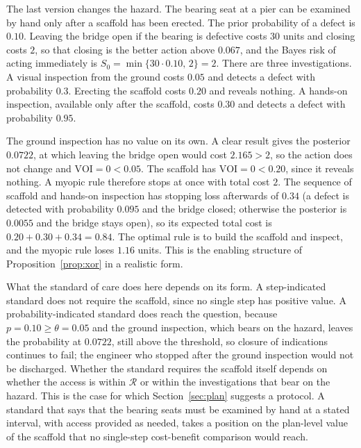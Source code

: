 \documentclass[11pt]{article}
\theoremstyle{plain}
\theoremstyle{definition}
\begin{document}
The last version changes the hazard. The bearing seat at a pier can be examined by hand only after a scaffold has been erected. The prior probability of a defect is $0.10$. Leaving the bridge open if the bearing is defective costs $30$ units and closing costs $2$, so that closing is the better action above $0.067$, and the Bayes risk of acting immediately is $S_0=\min\{30\cdot0.10,\,2\}=2$. There are three investigations. A visual inspection from the ground costs $0.05$ and detects a defect with probability $0.3$. Erecting the scaffold costs $0.20$ and reveals nothing. A hands-on inspection, available only after the scaffold, costs $0.30$ and detects a defect with probability $0.95$.

The ground inspection has no value on its own. A clear result gives the posterior $0.0722$, at which leaving the bridge open would cost $2.165>2$, so the action does not change and $\mathrm{VOI}=0<0.05$. The scaffold has $\mathrm{VOI}=0<0.20$, since it reveals nothing. A myopic rule therefore stops at once with total cost $2$. The sequence of scaffold and hands-on inspection has stopping loss afterwards of $0.34$ (a defect is detected with probability $0.095$ and the bridge closed; otherwise the posterior is $0.0055$ and the bridge stays open), so its expected total cost is $0.20+0.30+0.34=0.84$. The optimal rule is to build the scaffold and inspect, and the myopic rule loses $1.16$ units. This is the enabling structure of Proposition~\ref{prop:xor} in a realistic form.

What the standard of care does here depends on its form. A step-indicated standard does not require the scaffold, since no single step has positive value. A probability-indicated standard does reach the question, because $p=0.10\ge\theta=0.05$ and the ground inspection, which bears on the hazard, leaves the probability at $0.0722$, still above the threshold, so closure of indications continues to fail; the engineer who stopped after the ground inspection would not be discharged. Whether the standard requires the scaffold itself depends on whether the access is within $\mathcal R$ or within the investigations that bear on the hazard. This is the case for which Section~\ref{sec:plan} suggests a protocol. A standard that says that the bearing seats must be examined by hand at a stated interval, with access provided as needed, takes a position on the plan-level value of the scaffold that no single-step cost-benefit comparison would reach.
\end{document}
